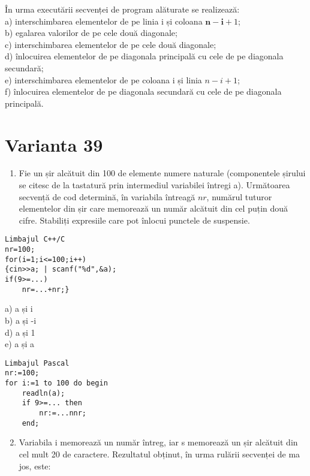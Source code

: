 În urma executării secvenței de program alăturate se realizează:\\
a) interschimbarea elementelor de pe linia i și coloana $\mathbf{n - i}+1$;\\
b) egalarea valorilor de pe cele două diagonale;\\
c) interschimbarea elementelor de pe cele două diagonale;\\
d) înlocuirea elementelor de pe diagonala principală cu cele de pe diagonala secundară;\\
e) interschimbarea elementelor de pe coloana i și linia $n-i+1$;\\
f) înlocuirea elementelor de pe diagonala secundară cu cele de pe diagonala principală.

\section*{Varianta 39}
\begin{enumerate}
  \item Fie un șir alcătuit din 100 de elemente numere naturale (componentele șirului se citesc de la tastatură prin intermediul variabilei întregi a). Următoarea secvență de cod determină, în variabila întreagă $n r$, numărul tuturor elementelor din șir care memorează un număr alcătuit din cel puțin două cifre. Stabiliți expresiile care pot înlocui punctele de suspensie.
\end{enumerate}

\begin{verbatim}
Limbajul C++/C
nr=100;
for(i=1;i<=100;i++)
{cin>>a; | scanf("%d",&a);
if(9>=...)
    nr=...+nr;}
\end{verbatim}

a) a și i\\
b) a și -i\\
d) a și 1\\
e) a și a

\begin{verbatim}
Limbajul Pascal
nr:=100;
for i:=1 to 100 do begin
    readln(a);
    if 9>=... then
        nr:=...nnr;
    end;
\end{verbatim}

\begin{enumerate}
  \setcounter{enumi}{1}
  \item Variabila i memorează un număr întreg, iar s memorează un șir alcătuit din cel mult 20 de caractere. Rezultatul obținut, în urma rulării secvenței de ma jos, este:
\end{enumerate}

